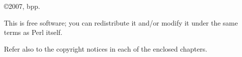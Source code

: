 \mbox{}

\vfill

\noindent \copyright 2007, bpp.

\noindent This is free software; you can redistribute it and/or modify it under
the same terms as Perl itself. 

\noindent Refer also to the copyright notices in each of the enclosed chapters.

